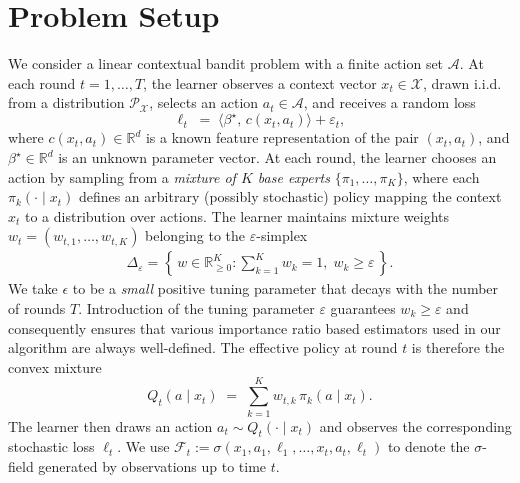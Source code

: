 \documentclass[11pt,letterpaper]{article}
\newcommand{\loss}{\ell}
\theoremstyle{plain}
\theoremstyle{definition}  %
\begin{document}
\section{Problem Setup}
\label{sec:prob-setup}
We consider a linear contextual bandit problem with a finite action set $\mathcal{A}$. 
At each round $t = 1, \ldots, T$, the learner observes a context vector $x_t \in \mathcal{X}$, drawn i.i.d. from a distribution $\mathcal{P_X}$, selects an action $a_t \in \mathcal{A}$, and receives a random loss
\begin{equation}\label{eqn:loss}
\loss_t \;=\; \langle \beta^\star,\, c(x_t, a_t) \rangle + \varepsilon_t,
\end{equation}
where $c(x_t, a_t) \in \mathbb{R}^d$ is a known feature representation of the pair $(x_t,a_t)$, and  
$\beta^\star \in \mathbb{R}^d$ is an unknown parameter vector. 
At each round, the learner chooses an action by sampling from a \emph{mixture of $K$ base experts} 
$\{\pi_1, \ldots, \pi_K\}$, where each $\pi_k( \cdot \mid x_t)$ defines an arbitrary (possibly stochastic) policy mapping the context $x_t$ to a distribution over actions.   
The learner maintains mixture weights $w_t = (w_{t,1}, \ldots, w_{t,K})$ belonging to the $\varepsilon$-simplex
\begin{align}
\label{eqn:eps-simplex}
\Delta_\varepsilon 
= 
\left\{\, w \in \mathbb{R}^K_{\ge 0} : \sum_{k=1}^K w_k = 1,\; w_k \ge \varepsilon \,\right\}.
\end{align}
We take $\epsilon$ to be a \emph{small} positive tuning parameter that decays with the number of rounds $T$. Introduction of the tuning parameter $\varepsilon$ guarantees $w_k \geq \varepsilon$ and consequently ensures that various importance ratio based estimators used in our algorithm are always well-defined. 
The effective policy at round $t$ is therefore the convex mixture
\begin{equation}
Q_t(a \mid x_t)
\;=\;
\sum_{k=1}^K w_{t,k}\,\pi_k(a \mid x_t).
\end{equation}
The learner then draws an action $a_t \sim Q_t(\cdot \mid x_t)$ and observes the corresponding stochastic loss $\loss_t$. We use $\mathcal{F}_t := \sigma(x_1, a_1, \loss_1, \ldots, x_{t}, a_t, \loss_t)$ to denote the $\sigma$-field generated by observations up to time $t$.  
\end{document}
